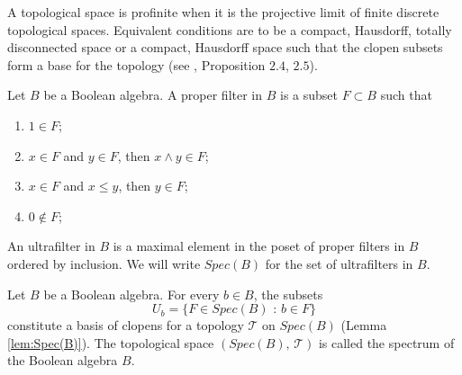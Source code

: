 \begin{definition}
    A topological space is profinite when it is the projective limit of finite discrete topological spaces. Equivalent conditions are to be a compact, Hausdorff, totally disconnected space or a compact, Hausdorff space such that the clopen subsets form a base for the topology (see \cite{magid2014separable}, Proposition $2.4$, $2.5$).
\end{definition}

\begin{definition}
\label{def:FilterBool}
    Let $B$ be a Boolean algebra. A proper filter in $B$ is a subset $F\subset B$ such that
    \begin{enumerate}
        \item $1\in F$;
        \item $x\in F$ and $y\in F$, then $x\wedge y\in F$;
        \item $x\in F$ and $x\leq y$, then $y\in F$;
        \item $0\not\in F$;
    \end{enumerate}
    An ultrafilter in $B$ is a maximal element in the poset of proper filters in $B$ ordered by inclusion. We will write $Spec(B)$ for the set of ultrafilters in $B$.
\end{definition}

\begin{definition}
    Let $B$ be a Boolean algebra. For every $b\in B$, the subsets
    \[ U_b = \{ F\in Spec(B)\text{ : }b\in F \} \]
    constitute a basis of clopens for a topology $\mathcal{T}$ on $Spec(B)$ (Lemma \ref{lem:Spec(B)}). The topological space $(Spec(B)\text{, }\mathcal{T})$ is called the spectrum of the Boolean algebra $B$.
\end{definition}

